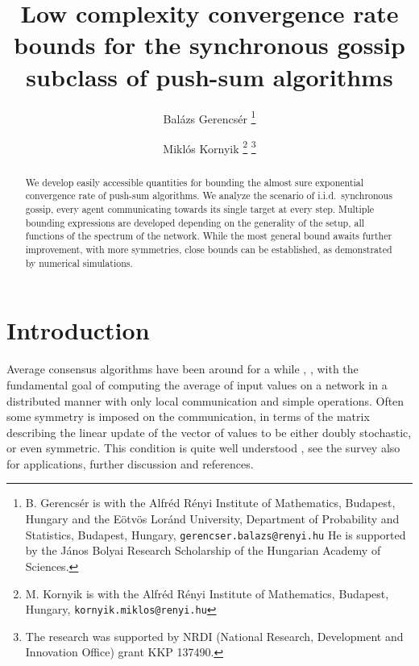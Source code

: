 \documentclass[a4paper,12pt]{article}
\begin{document}
	\title{Low complexity convergence rate bounds for the synchronous gossip subclass of push-sum algorithms}
	\author{Bal\'azs Gerencs\'er%
		\thanks{B. Gerencs\'er is with the Alfr\'ed R\'enyi Institute of Mathematics, Budapest, Hungary and the E\"otv\"os Lor\'and University, Department of Probability and Statistics, Budapest, Hungary, {\tt\small gerencser.balazs@renyi.hu} He is supported by the J\'anos Bolyai Research Scholarship of the Hungarian Academy of Sciences.} %
		\footnotemark[3]%
		\and %
		Mikl\'os Kornyik%
		\thanks{M. Kornyik is with the Alfr\'ed R\'enyi Institute of Mathematics, Budapest, Hungary, {\tt\small kornyik.miklos@renyi.hu}} %
		\thanks{The research was supported by NRDI (National Research, Development and Innovation Office) grant KKP 137490.}
	}
	
	\maketitle	
	
	
	\begin{abstract}
		We develop easily accessible quantities for bounding the almost sure exponential convergence rate of push-sum algorithms. We analyze the scenario of i.i.d.\ synchronous gossip, every agent communicating towards its single target at every step. Multiple bounding expressions are developed depending on the generality of the setup, all functions of the spectrum of the network. While the most general bound awaits further improvement, with more symmetries, close bounds can be established, as demonstrated by numerical simulations.
	\end{abstract}
	
	
	\section{Introduction}
	
	Average consensus algorithms have been around for a while  \cite{blondel2005convergence}, \cite{tsitsiklis:phd1984}, with the fundamental goal of computing the average of input values on a network in a distributed manner with only local communication and simple operations. Often some symmetry is imposed on the communication, in terms of the matrix describing the linear update of the vector of values to be either doubly stochastic, or even symmetric. This condition is quite well understood \cite{tahbaz2009consensus}, see the survey \cite{MAL-051} also for applications, further discussion and references.
	
\end{document}
